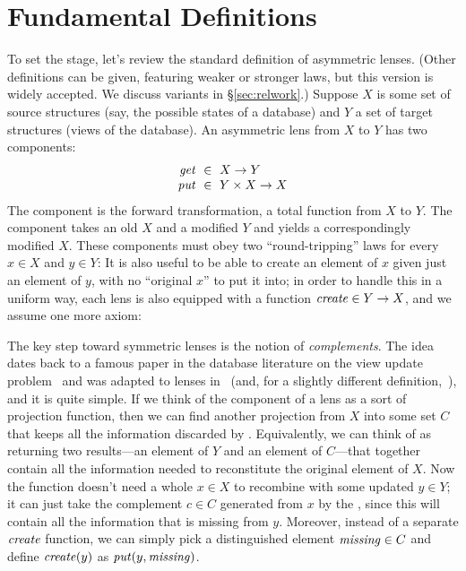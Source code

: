 \section{Fundamental Definitions} \label{symm}

\ifcomplement
{}
%
To set the stage, let's review the standard definition of
asymmetric lenses.  
%
(Other definitions can be given, featuring weaker or stronger laws, but this
version is widely accepted.  We discuss variants in
\S\ref{sec:relwork}.)
%
Suppose $X$ is some set of source structures (say, the possible states of a
database) and $Y$ a set of target structures (views of the database).
%
An asymmetric lens from $X$ to $Y$ has two components:
\[ 
\begin{array}{r@{\ \;}c@{\ \;}l}
\GET &\in& X \arrow Y\\
\PUT &\in& Y \times X \arrow X
\end{array}
\]
The \GET{} component is the forward transformation, a total function from
$X$ to $Y$.  The \PUT{} component takes an old $X$ and a modified $Y$ and
yields a correspondingly modified $X$.  These components
must obey two ``round-tripping'' laws for every $x \in X$ and $y
\in Y$:
%
%
It is also useful to be able to create an element of $x$ given just an
element of $y$, with no ``original $x$'' to put it into; in order to handle
this in a 
uniform way, each lens is also equipped with a
function $\mathit{create}\in Y\rightarrow X$, and we assume one more axiom:
\fi%

%
The key  step toward symmetric lenses is the notion
of {\em complements}.  The idea dates back to a famous paper in the
database literature on the view update
problem~\cite{DBLP:journals/tods/BancilhonS81} and was adapted to
lenses in~\cite{Matching10} (and, for a slightly different
definition,~\cite{matsuda2007btb}), and it is quite simple.  If we think of
the    
\GET{} component of a lens as a sort of projection function, then we can find
another projection from $X$ into some set $C$ that
keeps all the information discarded by \GET{}.  Equivalently, we can think
of \GET{} as returning two results---an element of $Y$ and an element of
$C$---that together contain all the information needed to reconstitute the
original element of $X$.  Now the \PUT{} function doesn't need a whole $x\in
X$ to recombine with some updated $y\in Y$; it can
just take the complement $c\in C$ generated from $x$ by the \GET, since this
will 
contain all the information that is missing from $y$.  Moreover, instead of
a separate
$\mathit{create}$ function, we can simply pick a distinguished element
$\mathit{missing}\in C$ and define $\mathit{create}(y)$ as $\mathit{put}(y,\mathit{missing})$.

